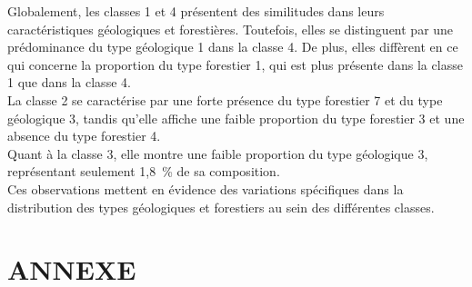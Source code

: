 \documentclass{article}
\begin{document}
Globalement, les classes 1 et 4 présentent des similitudes dans leurs caractéristiques géologiques et forestières. Toutefois, elles se distinguent par une prédominance du type géologique 1 dans la classe 4. De plus, elles diffèrent en ce qui concerne la proportion du type forestier 1, qui est plus présente dans la classe 1 que dans la classe 4.
\\
La classe 2 se caractérise par une forte présence du type forestier 7 et du type géologique 3, tandis qu'elle affiche une faible proportion du type forestier 3 et une absence du type forestier 4.
\\
Quant à la classe 3, elle montre une faible proportion du type géologique 3, représentant seulement 1,8~\% de sa composition.
\\
Ces observations mettent en évidence des variations spécifiques dans la distribution des types géologiques et forestiers au sein des différentes classes.


\newpage
\section{ANNEXE}





\end{document}
